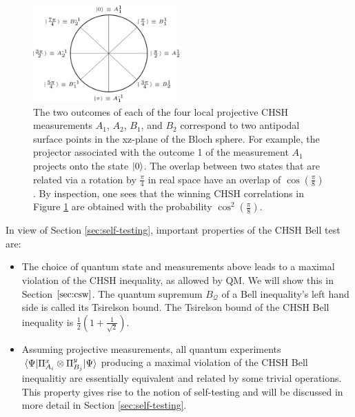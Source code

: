 \begin{figure}
    \centering
    \includegraphics[width=0.5\textwidth]{images/chshmnts.png}
    \caption{The two outcomes of each of the four local projective CHSH measurements $A_1$, $A_2$, $B_1$, and $B_2$ correspond to two antipodal surface points in the xz-plane of the Bloch sphere. For example, the projector associated with the outcome 1 of the measurement $A_1$ projects onto the state $\ket{0}$. The overlap between two states that are related via a rotation by $\frac{\pi}{4}$ in real space have an overlap of $\cos(\frac{\pi}{8})$. By inspection, one sees that the winning CHSH correlations in Figure \ref{fig:chshmnts} are obtained with the probability $\cos^2(\frac{\pi}{8})$.}
    \label{fig:chshmnts}
\end{figure}

In view of Section \ref{sec:self-testing}, important properties of the CHSH Bell test are:
\begin{itemize}
    \item The choice of quantum state and measurements above leads to a maximal violation of the CHSH inequality, as allowed by QM. We will show this in Section $\ref{sec:csw}$. The quantum supremum $B_\mathcal{Q}$ of a Bell inequality's left hand side is called its Tsirelson bound. The Tsirelson bound of the CHSH Bell inequality is $\frac{1}{2}(1+\frac{1}{\sqrt{2}})$.
    \item Assuming projective measurements, all quantum experiments $\expval{\Pi_{A_i}^x\otimes\Pi_{B_j}^y}{\Psi}$ producing a maximal violation of the CHSH Bell inequalitiy are essentially equivalent and related by some trivial operations. This property gives rise to the notion of self-testing and will be discussed in more detail in Section \ref{sec:self-testing}.
\end{itemize}

